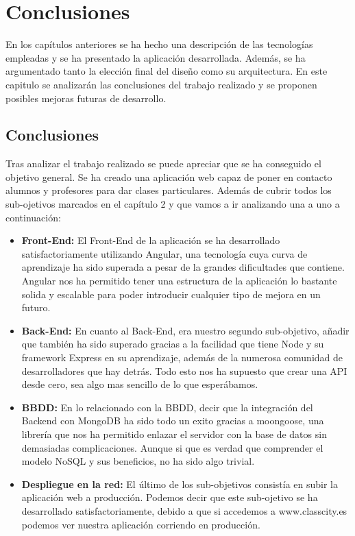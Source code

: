 \chapter{Conclusiones}
En los capítulos anteriores se ha hecho una descripción de las tecnologías empleadas y se ha presentado la aplicación desarrollada. Además, se ha argumentado tanto la elección final del diseño como su arquitectura. En este capitulo se analizarán las conclusiones del trabajo realizado y se proponen posibles mejoras futuras de desarrollo. 

\section{Conclusiones}
Tras analizar el trabajo realizado se puede apreciar que se ha conseguido el objetivo general. Se ha creado una aplicación web capaz de poner en contacto alumnos y profesores para dar clases particulares. Además de cubrir todos los sub-ojetivos marcados en el capítulo 2 y que vamos a ir analizando una a uno a continuación:
\begin{itemize}

 \item \textbf {Front-End: }El Front-End de la aplicación se ha desarrollado satisfactoriamente utilizando Angular, una tecnología cuya curva de aprendizaje ha sido superada a pesar de la grandes dificultades que contiene. Angular nos ha permitido tener una estructura de la aplicación lo bastante solida y escalable para poder introducir cualquier tipo de mejora en un futuro.
 \item \textbf {Back-End: }En cuanto al Back-End, era nuestro segundo sub-objetivo, añadir que también ha sido superado gracias a la facilidad que tiene Node y su framework Express en su aprendizaje, además de la numerosa comunidad de desarrolladores que hay detrás. Todo esto nos ha supuesto que crear una API desde cero, sea algo mas sencillo de lo que esperábamos.
 \item \textbf {BBDD: } En lo relacionado con la BBDD, decir que la integración del Backend con MongoDB ha sido todo un exito gracias a moongoose, una librería que nos ha permitido enlazar el servidor con la base de datos sin demasiadas complicaciones. Aunque si que es verdad que comprender el modelo NoSQL y sus beneficios, no ha sido algo trivial.
  \item \textbf {Despliegue en la red: }El último de los sub-objetivos consistía en subir la aplicación web a producción. Podemos decir que este sub-ojetivo se ha desarrollado satisfactoriamente, debido a que si accedemos a www.classcity.es podemos ver nuestra aplicación corriendo en producción. 

\end{itemize}


